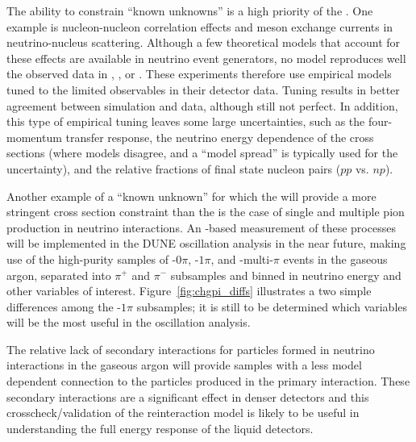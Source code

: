 \begin{itemize}
{The ability to constrain ``known unknowns'' is a high priority of the . One example is nucleon-nucleon correlation effects and meson exchange currents in neutrino-nucleus scattering.  Although a few theoretical models that account for these effects are available in neutrino event generators, no model reproduces well the observed data in , , or .  These experiments therefore use empirical models tuned to the limited observables in their detector data.  Tuning results in better agreement between simulation and data, although still not perfect. In addition, this type of empirical tuning leaves some large uncertainties, such as the four-momentum transfer response, the neutrino energy dependence of the cross sections (where models disagree, and a ``model spread'' is typically used for the uncertainty), and the relative fractions of final state nucleon pairs ($pp$ vs. $np$). 



Another example of a ``known unknown'' for which the  will provide a more stringent cross section constraint than the  is the case of single and multiple pion production in  neutrino interactions. An -based measurement of these processes will be implemented in the DUNE  oscillation analysis in the near future, making use of the high-purity samples of -$0\pi$, -$1\pi$, and -multi-$\pi$ events in the gaseous argon, separated into $\pi^+$ and $\pi^-$ subsamples and binned in neutrino energy and other variables of interest. Figure~\ref{fig:chgpi_diffs} illustrates a two simple differences among the  -$1\pi$ subsamples; it is still to be determined which variables will be the most useful in the  oscillation analysis.

The relative lack of secondary interactions for particles formed in neutrino interactions in the gaseous argon  will provide samples with a less model dependent connection to the particles produced in the primary interaction.  These secondary interactions are a significant effect in denser detectors \cite{Friedland:2018vry} and this crosscheck/validation of the reinteraction model is likely to be useful in understanding the full energy response of the liquid detectors.   


}
\end{itemize}
